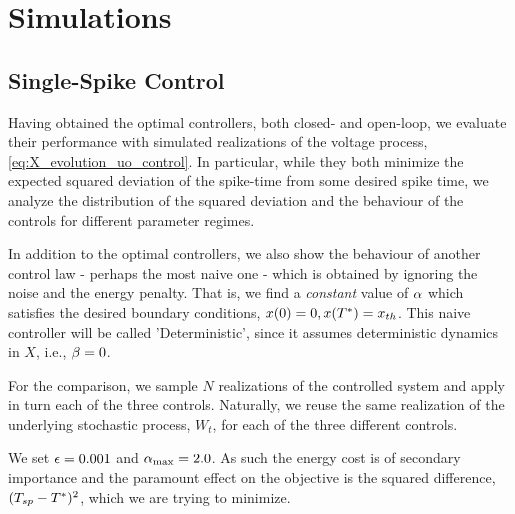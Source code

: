 
\section{Simulations} 
\subsection{Single-Spike Control}
\label{sec:probabilistic_numerical_test}
Having obtained the optimal controllers, both closed- and open-loop, we evaluate
their performance with simulated realizations of the voltage process,
\cref{eq:X_evolution_uo_control}. In particular, while they both minimize the expected
squared deviation of the spike-time from some desired spike time, we analyze
the distribution of the squared deviation and the behaviour of the
controls for different parameter regimes.

In addition to the optimal controllers, we also show the behaviour of
another control law - perhaps the most naive one - which is obtained by ignoring
the noise and the energy penalty. That is, we find a {\sl constant} value of
$\alpha$ which satisfies the desired boundary conditions, $x(0) = 0, x({ T^* }) = { x_{th} }$. This naive
controller will be called 'Deterministic', since it assumes deterministic
dynamics in $X$, i.e., $\beta = 0$.

For the comparison, we sample $N$ realizations of the controlled system
and apply in turn each of the three controls. Naturally, we reuse the same
realization of the underlying stochastic process, $W_t$, for each of the
three different controls.

We set ${\epsilon} = 0.001$ and ${ \alpha_{\textrm{max}} } = 2.0$. As such the energy cost is of secondary
importance and the paramount effect on the objective is the squared difference,
$(T_{sp} - { T^* })^2$, which we are trying to minimize.

